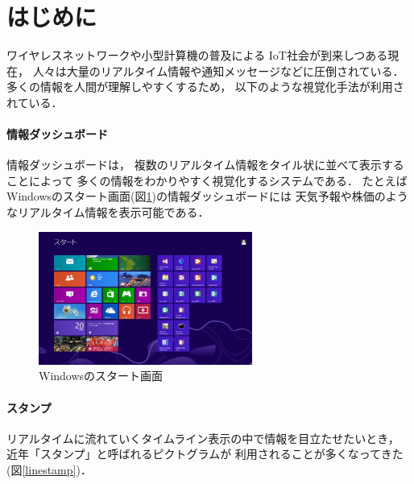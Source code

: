 \section{はじめに}


ワイヤレスネットワークや小型計算機の普及による
IoT社会が到来しつある現在，
人々は大量のリアルタイム情報や通知メッセージなどに圧倒されている．
%
多くの情報を人間が理解しやすくするため，
以下のような視覚化手法が利用されている．

\vspace{3mm}

\paragraph*{情報ダッシュボード}

情報ダッシュボード\cite{few}は，
複数のリアルタイム情報をタイル状に並べて表示することによって
多くの情報をわかりやすく視覚化するシステムである．
たとえばWindowsのスタート画面(図\ref{windows})の情報ダッシュボードには
天気予報や株価のようなリアルタイム情報を表示可能である．

\begin{figure}[h]
\centering
\includegraphics[width=7cm]{images/windows.png}
\caption{Windowsのスタート画面}
\label{windows}
\end{figure}


\vspace{2mm}
\paragraph*{スタンプ}

リアルタイムに流れていくタイムライン表示の中で情報を目立たせたいとき，
近年「スタンプ」と呼ばれるピクトグラムが
利用されることが多くなってきた(図\ref{linestamp})．

